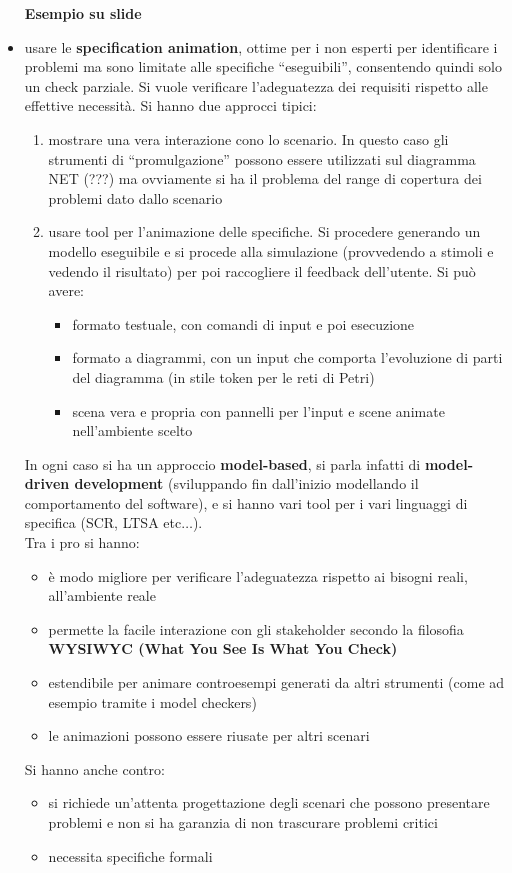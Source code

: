 \documentclass[a4paper,12pt, oneside]{book}
\begin{document}
\begin{itemize}
  \textbf{Esempio su slide}
  \item usare le \textbf{specification animation}, ottime per i non esperti per
  identificare i problemi ma sono limitate alle specifiche ``eseguibili'',
  consentendo quindi solo un check parziale. Si vuole verificare l'adeguatezza
  dei requisiti rispetto alle effettive necessità. Si hanno due approcci tipici:
  \begin{enumerate}
    \item mostrare una vera interazione cono lo scenario. In questo caso gli
    strumenti di ``promulgazione'' possono essere utilizzati sul diagramma NET
    (???) ma ovviamente si ha il problema del range di copertura dei problemi
    dato dallo scenario 
    \item usare tool per l'animazione delle specifiche. Si procedere generando
    un modello eseguibile e si procede alla simulazione (provvedendo a stimoli e
    vedendo il risultato) per poi raccogliere il feedback dell'utente. Si può
    avere:
    \begin{itemize}
      \item formato testuale, con comandi di input e poi esecuzione
      \item formato a diagrammi, con un input che comporta l'evoluzione di parti
      del diagramma (in stile token per le reti di Petri)
      \item scena vera e propria con pannelli per l'input e scene animate
      nell'ambiente scelto
    \end{itemize}
  \end{enumerate}
  In ogni caso si ha un approccio \textbf{model-based}, si parla infatti di
  \textbf{model-driven development} (sviluppando fin dall'inizio modellando il
  comportamento del software), e si hanno vari tool per
  i vari linguaggi di specifica (SCR, LTSA etc$\ldots$).\\
  Tra i pro si hanno:
  \begin{itemize}
    \item è modo migliore per verificare l'adeguatezza rispetto ai bisogni
    reali, all'ambiente reale
    \item permette la facile interazione con gli stakeholder secondo la
    filosofia \textbf{WYSIWYC (What You See Is What You Check)}
    \item estendibile per animare controesempi generati da altri strumenti (come
    ad esempio tramite i model checkers)
    \item le animazioni possono essere riusate per altri scenari
  \end{itemize}
  Si hanno anche contro:
  \begin{itemize}
    \item si richiede un'attenta progettazione degli scenari che possono presentare
    problemi e non si ha garanzia di non trascurare problemi critici
    \item necessita specifiche formali 
  \end{itemize}
  

\end{itemize}
\end{document}
